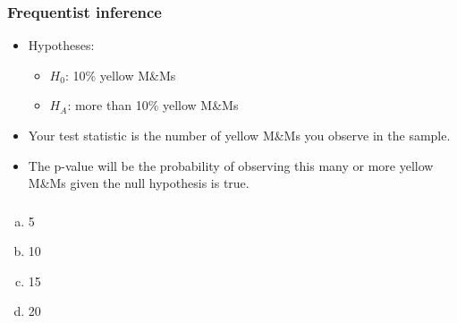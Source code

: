 \documentclass[slidestop,compress,mathserif,12pt,t,professionalfonts,xcolor=table]{beamer}
\begin{document}
\begin{frame}
\frametitle{Frequentist inference}

\begin{itemize}

\item Hypotheses:
\begin{itemize}
\item $H_0$: 10\% yellow M\&Ms
\item $H_A$: more than 10\% yellow M\&Ms 
\end{itemize}

\item Your test statistic is the number of yellow M\&Ms you observe in the sample. 

\item The p-value will be the probability of observing this many or more yellow M\&Ms given the null hypothesis is true.

\end{itemize}

\end{frame}


\begin{frame}
\frametitle{}


\begin{multicols}{4}
\begin{enumerate}[(a)]
\item 5
\item 10
\item 15
\item 20
\end{enumerate}
\end{multicols}


\end{frame}

\end{document}
